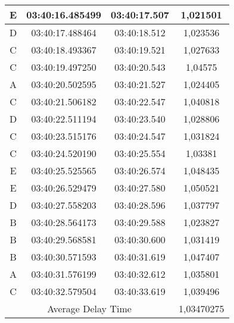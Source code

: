 \begin{table}[!ht]
\begin{tabular}{|ccc|c|}
  \multicolumn{1}{|c|}{E}    & \multicolumn{1}{c|}{03:40:16.485499} & 03:40:17.507       & 1,021501   \\ \hline
  \multicolumn{1}{|c|}{D}    & \multicolumn{1}{c|}{03:40:17.488464} & 03:40:18.512       & 1,023536   \\ \hline
  \multicolumn{1}{|c|}{C}    & \multicolumn{1}{c|}{03:40:18.493367} & 03:40:19.521       & 1,027633   \\ \hline
  \multicolumn{1}{|c|}{C}    & \multicolumn{1}{c|}{03:40:19.497250} & 03:40:20.543       & 1,04575    \\ \hline
  \multicolumn{1}{|c|}{A}    & \multicolumn{1}{c|}{03:40:20.502595} & 03:40:21.527       & 1,024405   \\ \hline
  \multicolumn{1}{|c|}{C}    & \multicolumn{1}{c|}{03:40:21.506182} & 03:40:22.547       & 1,040818   \\ \hline
  \multicolumn{1}{|c|}{D}    & \multicolumn{1}{c|}{03:40:22.511194} & 03:40:23.540       & 1,028806   \\ \hline
  \multicolumn{1}{|c|}{C}    & \multicolumn{1}{c|}{03:40:23.515176} & 03:40:24.547       & 1,031824   \\ \hline
  \multicolumn{1}{|c|}{C}    & \multicolumn{1}{c|}{03:40:24.520190} & 03:40:25.554       & 1,03381    \\ \hline
  \multicolumn{1}{|c|}{E}    & \multicolumn{1}{c|}{03:40:25.525565} & 03:40:26.574       & 1,048435   \\ \hline
  \multicolumn{1}{|c|}{E}    & \multicolumn{1}{c|}{03:40:26.529479} & 03:40:27.580       & 1,050521   \\ \hline
  \multicolumn{1}{|c|}{D}    & \multicolumn{1}{c|}{03:40:27.558203} & 03:40:28.596       & 1,037797   \\ \hline
  \multicolumn{1}{|c|}{B}    & \multicolumn{1}{c|}{03:40:28.564173} & 03:40:29.588       & 1,023827   \\ \hline
  \multicolumn{1}{|c|}{B}    & \multicolumn{1}{c|}{03:40:29.568581} & 03:40:30.600       & 1,031419   \\ \hline
  \multicolumn{1}{|c|}{B}    & \multicolumn{1}{c|}{03:40:30.571593} & 03:40:31.619       & 1,047407   \\ \hline
  \multicolumn{1}{|c|}{A}    & \multicolumn{1}{c|}{03:40:31.576199} & 03:40:32.612       & 1,035801   \\ \hline
  \multicolumn{1}{|c|}{C}    & \multicolumn{1}{c|}{03:40:32.579504} & 03:40:33.619       & 1,039496   \\ \hline
  \multicolumn{3}{|c|}{Average Delay Time}                                               & 1,03470275 \\ \hline
  \end{tabular}
  \end{table}

